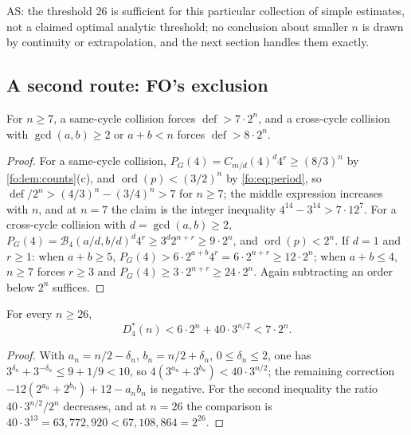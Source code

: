 \documentclass[11pt,a4paper]{article}
\numberwithin{equation}{section}
\theoremstyle{definition}
\theoremstyle{remark}
\newcommand{\ord}{\operatorname{ord}}
\newcommand{\Bip}{\mathcal B}
\newcommand{\defi}{\operatorname{def}}
\begin{document}
AS: the threshold $26$ is sufficient for this particular collection of simple
estimates, not a claimed optimal analytic threshold; no conclusion about
smaller $n$ is drawn by continuity or extrapolation, and the next section
handles them exactly.

\subsection{A second route: FO's exclusion}

\begin{lemma}\label{fo:fo:lem:eliminate}
For $n\ge7$, a same-cycle collision forces $\defi>7\cdot2^n$, and a
cross-cycle collision with $\gcd(a,b)\ge2$ or $a+b<n$ forces
$\defi>8\cdot2^n$.
\end{lemma}

\begin{proof}
For a same-cycle collision, $P_G(4)=C_{m/d}(4)^d4^r\ge(8/3)^n$ by
\cref{fo:lem:counts}(c), and $\ord(p)<(3/2)^n$ by \eqref{fo:eq:period}, so
$\defi/2^n>(4/3)^n-(3/4)^n>7$ for $n\ge7$; the middle expression increases
with $n$, and at $n=7$ the claim is the integer inequality
$4^{14}-3^{14}>7\cdot12^7$. For a cross-cycle collision with
$d=\gcd(a,b)\ge2$, $P_G(4)=\Bip_4(a/d,b/d)^d4^r\ge3^d2^{n+r}\ge9\cdot2^n$, and
$\ord(p)<2^n$. If $d=1$ and $r\ge1$: when $a+b\ge5$,
$P_G(4)>6\cdot2^{a+b}4^r=6\cdot2^{n+r}\ge12\cdot2^n$; when $a+b\le4$, $n\ge7$
forces $r\ge3$ and $P_G(4)\ge3\cdot2^{n+r}\ge24\cdot2^n$. Again subtracting an
order below $2^n$ suffices.
\end{proof}

\begin{lemma}\label{fo:fo:lem:threshold}
For every $n\ge26$,
\begin{equation}\label{fo:fo:eq:threshold}
 D^*_4(n)<6\cdot2^n+40\cdot3^{n/2}<7\cdot2^n.
\end{equation}
\end{lemma}

\begin{proof}
With $a_n=n/2-\delta_n$, $b_n=n/2+\delta_n$, $0\le\delta_n\le2$, one has
$3^{\delta_n}+3^{-\delta_n}\le9+1/9<10$, so $4(3^{a_n}+3^{b_n})<40\cdot3^{n/2}$;
the remaining correction $-12(2^{a_n}+2^{b_n})+12-a_nb_n$ is negative. For
the second inequality the ratio $40\cdot3^{n/2}/2^n$ decreases, and at $n=26$
the comparison is $40\cdot3^{13}=63{,}772{,}920<67{,}108{,}864=2^{26}$.
\end{proof}
\end{document}
